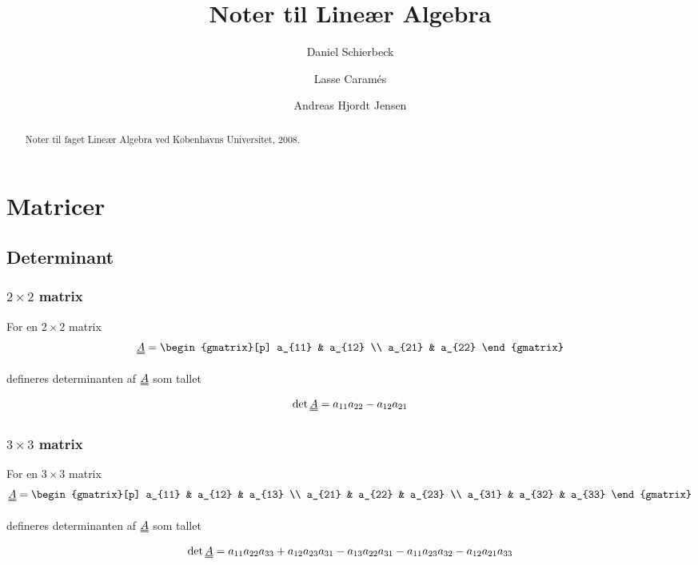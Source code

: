 \documentclass[a4paper]{article}
\title{Noter til Lineær Algebra}
\author{Daniel Schierbeck \and Lasse Caramés \and Andreas Hjordt Jensen}
\newcommand{\mtx}[1]{\uuline{#1}}
\begin{document}
\maketitle

\begin{abstract}
Noter til faget Lineær Algebra ved Københavns Universitet, 2008.
\end{abstract}

\tableofcontents

\section{Matricer}

\subsection{Determinant}

\subsubsection{$2 \times 2$ matrix}

For en $2 \times 2$ matrix
$$
\mtx{A} =
\begin{gmatrix}[p]
    a_{11} & a_{12} \\
    a_{21} & a_{22}
\end{gmatrix}
$$

defineres determinanten af $\mtx{A}$ som tallet
$$
\det{\mtx{A}} = a_{11}a_{22} - a_{12}a_{21}
$$


\subsubsection{$3 \times 3$ matrix}

For en $3 \times 3$ matrix
$$
\mtx{A} =
\begin{gmatrix}[p]
    a_{11} & a_{12} & a_{13} \\
    a_{21} & a_{22} & a_{23} \\
    a_{31} & a_{32} & a_{33}
\end{gmatrix}
$$

defineres determinanten af $\mtx{A}$ som tallet
$$
\det{\mtx{A}} = a_{11}a_{22}a_{33} + a_{12}a_{23}a_{31} - a_{13}a_{22}a_{31} - a_{11}a_{23}a_{32} - a_{12}a_{21}a_{33}
$$
\end{document}
